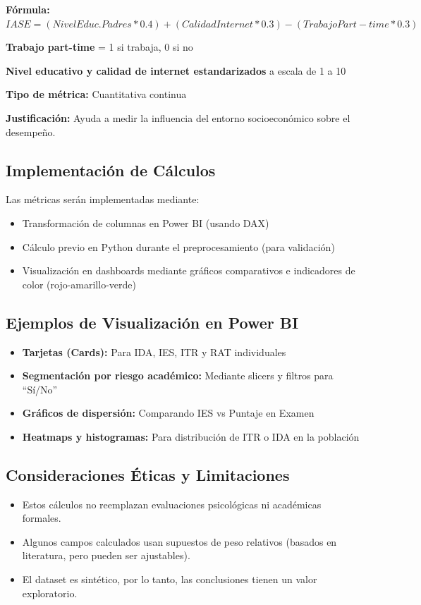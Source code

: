 \documentclass[12pt,letterpaper]{report}
\begin{document}
\textbf{Fórmula:}
\(IASE = (Nivel Educ. Padres * 0.4) + (Calidad Internet * 0.3) - (Trabajo Part-time * 0.3)
\)

\textbf{Trabajo part-time} = 1 si trabaja, 0 si no

\textbf{Nivel educativo y calidad de internet estandarizados} a escala de 1 a 10

\textbf{Tipo de métrica:} Cuantitativa continua

\textbf{Justificación:} Ayuda a medir la influencia del entorno socioeconómico sobre el desempeño.


\subsection{Implementación de Cálculos}
Las métricas serán implementadas mediante:  
\begin{itemize}
    \item Transformación de columnas en Power BI (usando DAX)
    \item Cálculo previo en Python durante el preprocesamiento (para validación)
    \item Visualización en dashboards mediante gráficos comparativos e indicadores de color (rojo-amarillo-verde)
\end{itemize}

\subsection{Ejemplos de Visualización en Power BI}

\begin{itemize}
    \item \textbf{Tarjetas (Cards):} Para IDA, IES, ITR y RAT individuales
    \item \textbf{Segmentación por riesgo académico:} Mediante slicers y filtros para “Sí/No”
    \item \textbf{Gráficos de dispersión:} Comparando IES vs Puntaje en Examen
    \item \textbf{Heatmaps y histogramas:} Para distribución de ITR o IDA en la población
\end{itemize}

\subsection{Consideraciones Éticas y Limitaciones}

\begin{itemize}
    \item Estos cálculos no reemplazan evaluaciones psicológicas ni académicas formales.
    \item Algunos campos calculados usan supuestos de peso relativos (basados en literatura, pero pueden ser ajustables).
    \item El dataset es sintético, por lo tanto, las conclusiones tienen un valor exploratorio.
\end{itemize}
\end{document}
